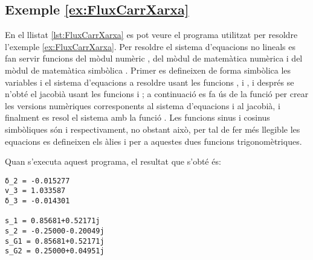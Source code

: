 \hypertarget{exemple:FluxCarrXarxa}{\subsection{Exemple \ref*{ex:FluxCarrXarxa} \FluxCarrXarxa}}
En el llistat \vref{lst:FluxCarrXarxa} es pot veure el programa utilitzat per resoldre l'exemple \vref{ex:FluxCarrXarxa}. Per resoldre el sistema d'equacions no lineals  es fan servir funcions del mòdul numèric , del mòdul de matemàtica numèrica  i del mòdul de matemàtica simbòlica . Primer es defineixen de forma simbòlica les variables i el sistema d'equacions a resoldre usant les funcions ,  i , i després se n'obté el jacobià usant les funcions  i ; a continuació es fa ús de la funció   per crear les versions numèriques corresponents al sistema d'equacions i al jacobià, i finalment es resol el sistema amb la funció . Les funcions sinus i cosinus simbòliques són   i   respectivament, no obstant això,  per tal de fer més llegible les equacions es defineixen els àlies  i  per a aquestes dues funcions trigonomètriques.


Quan s'executa aquest programa, el resultat que s'obté és:
\lstset{
	language=,
	numbers=none,
	frame=none
}
\begin{lstlisting}
δ_2 = -0.015277
v_3 = 1.033587
δ_3 = -0.014301

s_1 = 0.85681+0.52171j
s_2 = -0.25000-0.20049j
s_G1 = 0.85681+0.52171j
s_G2 = 0.25000+0.04951j
\end{lstlisting} 


